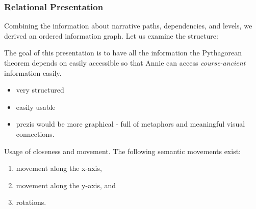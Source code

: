 
\begin{frame}
  \frametitle{Relational Presentation}
  \begin{module}[id=relationalPresentation]

Combining the information about narrative paths, dependencies, and levels, we derived an ordered information graph. Let us examine the structure:

The goal of this presentation is to have all the information the Pythagorean theorem depends on easily accessible so that Annie can access \textit{course-ancient} information easily.
\begin{itemize}
\item very structured
\item easily usable
\item prezis would be more graphical - full of metaphors and meaningful visual connections.
\end{itemize}



Usage of closeness and movement. The following semantic movements exist:\\
\vspace{-12pt}
\begin{enumerate}[topsep=0pt,itemsep=-1ex,partopsep=1ex,parsep=1ex]
\item movement along the x-axis,
\item movement along the y-axis, and
\item rotations.
\end{enumerate}
\vspace{5pt}

  \end{module}
\end{frame}
